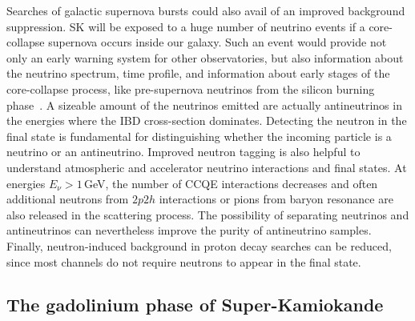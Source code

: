 Searches of galactic supernova bursts could also avail of an improved background suppression.
SK will be exposed to a huge number of neutrino events if a core-collapse supernova occurs inside our galaxy.
Such an event would provide not only an early warning system for other observatories, %
but also information about the neutrino spectrum, time profile, and information about early stages of the core-collapse process, %
like pre-supernova neutrinos from the silicon burning phase~\cite{Simpson:2019xwo}.
A sizeable amount of the neutrinos emitted are actually antineutrinos in the energies where the IBD cross-section dominates.
Detecting the neutron in the final state is fundamental for distinguishing whether the incoming particle is %
a neutrino or an antineutrino.
Improved neutron tagging is also helpful to understand atmospheric and accelerator neutrino interactions and final states.
At energies $E_\nu > 1$\,GeV, the number of CCQE interactions decreases and often additional neutrons %
from $2p2h$ interactions or pions from baryon resonance are also released in the scattering process.
The possibility of separating neutrinos and antineutrinos can nevertheless improve the purity of antineutrino samples.
Finally, neutron-induced background in proton decay searches can be reduced, %
since most channels do not require neutrons to appear in the final state.



\subsection{The gadolinium phase of Super-Kamiokande}
\label{sec:gadolinium}

